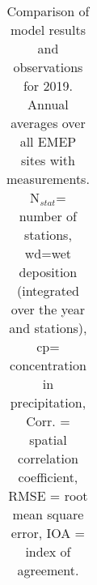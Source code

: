\begin{table}
\begin{center}
\begin{tabular}{c|ccccccc}
\end{tabular}

\vspace{0.2cm}

\caption{Comparison of model results and observations for 2019. Annual
averages over all EMEP sites with measurements.  N$_{stat}$= number of stations,
wd=wet deposition (integrated over the year and stations), cp= concentration
in precipitation, Corr. = spatial correlation coefficient, RMSE = root mean
square error, IOA = index of agreement.}
\label{tab:tableSN}
\end{center}
\end{table}







%

